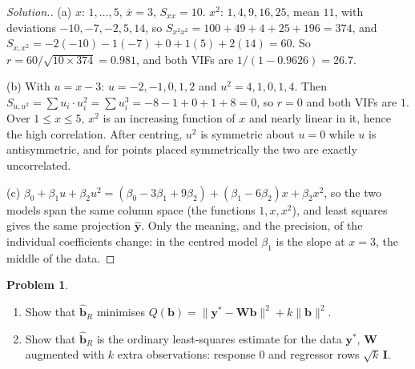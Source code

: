 \documentclass[11pt,a4paper]{article}
\numberwithin{equation}{section}
\theoremstyle{definition}
\newtheorem{problemx}{Problem}[subsection]
\newenvironment{problem}{\begin{problemx}}{\end{problemx}}
\newenvironment{solution}
  {\renewcommand{\qedsymbol}{}\begin{proof}[\textit{Solution}.]}
  {\end{proof}}
\begin{document}
\begin{solution}
(a) $x$: $1, \dots, 5$, $\bar x = 3$, $S_{xx} = 10$. $x^2$: $1, 4, 9, 16, 25$, mean $11$, with deviations
$-10, -7, -2, 5, 14$, so $S_{x^2x^2} = 100 + 49 + 4 + 25 + 196 = 374$, and
$S_{x,x^2} = -2(-10) - 1(-7) + 0 + 1(5) + 2(14) = 60$. So
$r = 60/\sqrt{10 \times 374} = 0.981$, and both VIFs are $1/(1 - 0.9626) = 26.7$.

(b) With $u = x - 3$: $u = -2, -1, 0, 1, 2$ and $u^2 = 4, 1, 0, 1, 4$. Then
$S_{u,u^2} = \sum u_i \cdot u_i^2 = \sum u_i^3 = -8 - 1 + 0 + 1 + 8 = 0$, so $r = 0$ and both VIFs are $1$.
Over $1 \le x \le 5$, $x^2$ is an increasing function of $x$ and nearly linear in it, hence the high
correlation. After centring, $u^2$ is symmetric about $u = 0$ while $u$ is antisymmetric, and for points
placed symmetrically the two are exactly uncorrelated.

(c) $\beta_0 + \beta_1u + \beta_2u^2 = (\beta_0 - 3\beta_1 + 9\beta_2) + (\beta_1 - 6\beta_2)x + \beta_2x^2$, so the two
models span the same column space (the functions $1, x, x^2$), and least squares gives the same projection
$\hat{\mathbf{y}}$. Only the meaning, and the precision, of the individual coefficients change: in the
centred model $\beta_1$ is the slope at $x = 3$, the middle of the data.
\end{solution}

\begin{problem}\label{prob:ridge-penalty}
\begin{enumerate}[label=(\alph*)]
\item Show that $\hat{\mathbf{b}}_R$ minimises $Q(\mathbf{b}) = \|\mathbf{y}^* - \mathbf{Wb}\|^2 + k\|\mathbf{b}\|^2$.
\item Show that $\hat{\mathbf{b}}_R$ is the ordinary least-squares estimate for the data $\mathbf{y}^*$, $\mathbf{W}$
augmented with $k$ extra observations: response $0$ and regressor rows $\sqrt{k}\,\mathbf{I}$.
\end{enumerate}
\end{problem}
\end{document}
